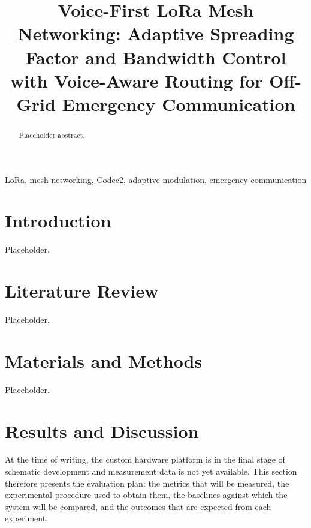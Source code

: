 \documentclass[a4paper,10pt]{article}
\begin{document}
\title{Voice-First LoRa Mesh Networking: Adaptive Spreading Factor and
Bandwidth Control with Voice-Aware Routing for Off-Grid
Emergency Communication}

\author{
}

\maketitle

\begin{abstract}
Placeholder abstract.
\end{abstract}

\begin{IEEEkeywords}
LoRa, mesh networking, Codec2, adaptive modulation, emergency communication
\end{IEEEkeywords}

\section{Introduction}
Placeholder.

\section{Literature Review}
Placeholder.

\section{Materials and Methods}
Placeholder.

\section{Results and Discussion}

At the time of writing, the custom hardware platform is in the final
stage of schematic development and measurement data is not yet
available. This section therefore presents the evaluation plan: the
metrics that will be measured, the experimental procedure used to
obtain them, the baselines against which the system will be compared,
and the outcomes that are expected from each experiment.
\end{document}
